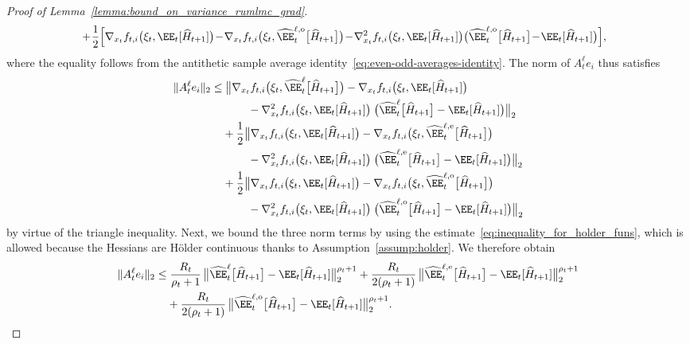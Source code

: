\documentclass[11pt]{article}
\let\hat\widehat
\begin{document}
\begin{proof}[Proof of Lemma~\ref{lemma:bound_on_variance_rumlmc_grad}]
\begin{align*}
    & + \! \frac{1}{2}\Big[\nabla_{x_t} f_{t,i} \big(\xi_t, \EE_t[\hat{H}_{t+1}]\big)  
    \! - \! \nabla_{x_t} f_{t,i} \big(\xi_t, \hat\EE_t^{\ell, {\rm o}}\big[\hat{H}_{t+1}\big]\big) \! - \! \nabla^2_{x_t} f_{t,i} \big(\xi_t,\EE_t[\hat{H}_{t+1}]\big) \big(\hat\EE_t^{\ell, {\rm o}}\big[\hat{H}_{t+1}\big]\! - \!\EE_t[\hat{H}_{t+1}]\big)\Big],
\end{align*}
where the equality follows from the antithetic sample average identity~\eqref{eq:even-odd-averages-identity}. The norm of $A_t^\ell e_i$ thus satisfies
\begin{align*}
   \|A_t^\ell e_i\|_{2} 
    \leq &\; \big\|\nabla_{x_t} f_{t,i} \big(\xi_t, \hat\EE_t^{\ell}\big[\hat{H}_{t+1}\big]\big) - \nabla_{x_t} f_{t,i} \big(\xi_t, \EE_t[\hat{H}_{t+1}]\big) \\
    &\qquad\;- \nabla^2_{x_t} f_{t,i} \big(\xi_t,\EE_t[\hat{H}_{t+1}]\big)\; \big(\hat\EE_t^{\ell}\big[\hat{H}_{t+1}\big]-\EE_t[\hat{H}_{t+1}]\big)\big\|_2\\
    & +\frac{1}{2}\big\|\nabla_{x_t} f_{t,i} \big(\xi_t, \EE_t[\hat{H}_{t+1}]\big) 
    - \nabla_{x_t} f_{t,i} \big(\xi_t, \hat\EE_t^{\ell, {\rm e}}\big[\hat{H}_{t+1}\big]\big) \\
    &\qquad\;  - \nabla^2_{x_t} f_{t,i} \big(\xi_t,\EE_t[\hat{H}_{t+1}]\big)\; \big(\hat\EE_t^{\ell, {\rm e}}\big[\hat{H}_{t+1}\big]-\EE_t[\hat{H}_{t+1}]\big) \big\|_2\\
    & +\frac{1}{2}\big\|\nabla_{x_t} f_{t,i} \big(\xi_t, \EE_t[\hat{H}_{t+1}]\big)  
    - \nabla_{x_t} f_{t,i} \big(\xi_t, \hat\EE_t^{\ell, {\rm o}}\big[\hat{H}_{t+1}\big]\big) \\
    &\qquad\; - \nabla^2_{x_t} f_{t,i} \big(\xi_t,\EE_t[\hat{H}_{t+1}]\big)\; \big(\hat\EE_t^{\ell, {\rm o}}\big[\hat{H}_{t+1}\big]-\EE_t[\hat{H}_{t+1}]\big)\big\|_2
\end{align*}
by virtue of the triangle inequality. Next, we bound the three norm terms by using the estimate~\eqref{eq:inequality_for_holder_funs}, which is allowed because the Hessians are H\"older continuous thanks to 
Assumption~\ref{assump:holder}. We therefore obtain
\begin{align*}
   \|A_t^\ell e_i\|_{2} 
    \leq &\;\frac{R_t}{\rho_t+1} \, \big\|\hat\EE_t^{\ell}\big[\hat{H}_{t+1}\big] - \EE_t[\hat{H}_{t+1}]\big\|_2^{\rho_t+1} 
    + \frac{R_t}{2(\rho_t+1)} \, \big\|\hat\EE_t^{\ell, {\rm e}}\big[\hat{H}_{t+1}\big] - \EE_t[\hat{H}_{t+1}]\big\|_2^{\rho_t+1} \\
    &+ \frac{R_t}{2(\rho_t+1)} \, \big\|\hat\EE_t^{\ell, {\rm o}}\big[\hat{H}_{t+1}\big] - \EE_t[\hat{H}_{t+1}]\big\|_2^{\rho_t+1}.

\end{align*}
\end{proof}
\end{document}
